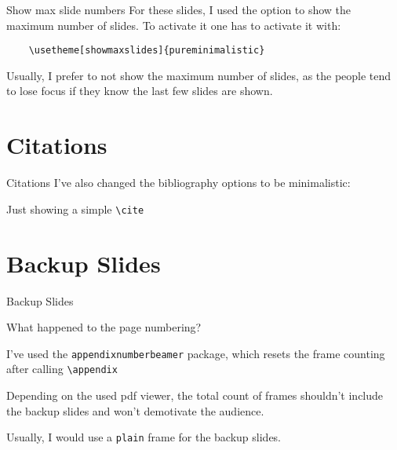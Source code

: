 \documentclass[aspectratio=169]{beamer}
\begin{document}
\begin{frame}[fragile]{Show max slide numbers}
  For these slides, I used the option to
  show the maximum number of slides. To activate it
  one has to activate it with:
  \begin{verbatim}
    \usetheme[showmaxslides]{pureminimalistic}
  \end{verbatim}
  Usually, I prefer to not show the maximum number of
  slides, as the people tend to lose focus if they know
  the last few slides are shown.
\end{frame}

\section{Citations}
\begin{frame}{Citations}
  I've also changed the bibliography options to be minimalistic:

  Just showing a simple \texttt{\textbackslash{}cite} \cite{AlexNet}
  \vfill 
  \printbibliography
\end{frame}

\appendix %
\section*{Backup Slides}
\begin{frame}
  \centering
  \vfill
  {\fontsize{40}{50}\selectfont Backup Slides}
  \vfill
\end{frame}

\begin{frame}{What happened to the page numbering?}
  \begin{vfilleditems}
    \item I've used the \texttt{appendixnumberbeamer}
    package, which resets the frame counting after calling
    \texttt{\textbackslash{}appendix}
    \item Depending on the used pdf viewer, the total
    count of frames shouldn't include the backup slides and
    won't demotivate the audience.
    \item Usually, I would use a \texttt{plain} frame
    for the backup slides.
  \end{vfilleditems}
\end{frame}
\end{document}
